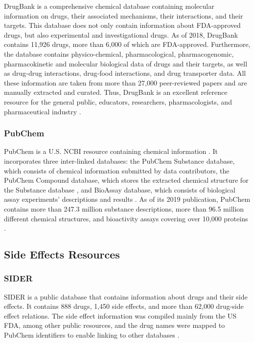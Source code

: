DrugBank is a comprehensive chemical database containing molecular information on drugs, their associated mechanisms, their interactions, and their targets.
This database does not only contain information about \ac{FDA}-approved drugs, but also experimental and investigational drugs.
As of 2018, DrugBank contains 11,926 drugs, more than 6,000 of which are \ac{FDA}-approved.
Furthermore, the database contains physico-chemical, pharmacological, pharmacogenomic, pharmacokinetic and molecular biological data of drugs and their targets, as well as drug-drug interactions, drug-food interactions, and drug transporter data.
All these information are taken from more than 27,000 peer-reviewed papers and are manually extracted and curated.
Thus, DrugBank is an excellent reference resource for the general public, educators, researchers, pharmacologists, and pharmaceutical industry \cite{wishart_drugbank_2018}.

\subsubsection{PubChem}

PubChem is a U.S. \ac{NCBI} resource containing chemical information \cite{kim_pubchem_2019}.
It incorporates three inter-linked databases: the PubChem Substance database, which consists of chemical information submitted by data contributors, the PubChem Compound database, which stores the extracted chemical structure for the Substance database \cite{kim_pubchem_2016}, and BioAssay database, which consists of biological assay experiments’ descriptions and results \cite{kim_pubchem_2019}.
As of its 2019 publication, PubChem contains more than 247.3 million substance descriptions, more than 96.5 million different chemical structures, and bioactivity assays covering over 10,000 proteins \cite{kim_pubchem_2019}.

\subsection{Side Effects Resources}

\subsubsection{SIDER}

\ac{SIDER} is a public database that contains information about drugs and their side effects.
It contains 888 drugs, 1,450 side effects, and more than 62,000 drug-side effect relations.
The side effect information was compiled mainly from the US \ac{FDA}, among other public resources, and the drug names were mapped to PubChem identifiers to enable linking to other databases \cite{kuhn_side_2010}.

